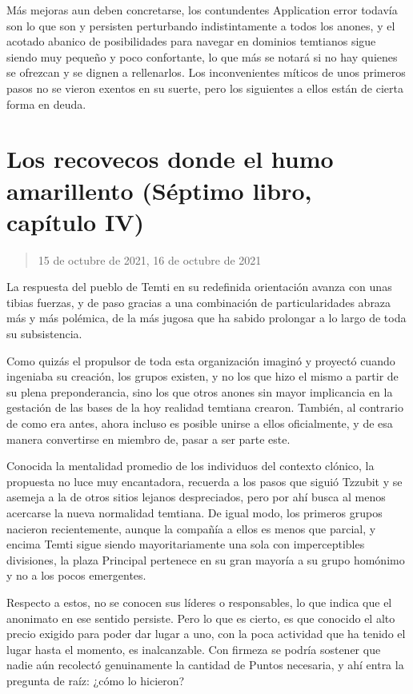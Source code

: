 \documentclass[
]{book}
\begin{document}
Más mejoras aun deben concretarse, los contundentes Application error todavía son lo que son y persisten perturbando indistintamente a todos los anones, y el acotado abanico de posibilidades para navegar en dominios temtianos sigue siendo muy pequeño y poco confortante, lo que más se notará si no hay quienes se ofrezcan y se dignen a rellenarlos. Los inconvenientes míticos de unos primeros pasos no se vieron exentos en su suerte, pero los siguientes a ellos están de cierta forma en deuda.

\hypertarget{los-recovecos-donde-el-humo-amarillento-suxe9ptimo-libro-capuxedtulo-iv}{%
\section{Los recovecos donde el humo amarillento (Séptimo libro, capítulo IV)}\label{los-recovecos-donde-el-humo-amarillento-suxe9ptimo-libro-capuxedtulo-iv}}

\begin{quote}
15 de octubre de 2021, 16 de octubre de 2021
\end{quote}

La respuesta del pueblo de Temti en su redefinida orientación avanza con unas tibias fuerzas, y de paso gracias a una combinación de particularidades abraza más y más polémica, de la más jugosa que ha sabido prolongar a lo largo de toda su subsistencia.

Como quizás el propulsor de toda esta organización imaginó y proyectó cuando ingeniaba su creación, los grupos existen, y no los que hizo el mismo a partir de su plena preponderancia, sino los que otros anones sin mayor implicancia en la gestación de las bases de la hoy realidad temtiana crearon. También, al contrario de como era antes, ahora incluso es posible unirse a ellos oficialmente, y de esa manera convertirse en miembro de, pasar a ser parte este.

Conocida la mentalidad promedio de los individuos del contexto clónico, la propuesta no luce muy encantadora, recuerda a los pasos que siguió Tzzubit y se asemeja a la de otros sitios lejanos despreciados, pero por ahí busca al menos acercarse la nueva normalidad temtiana. De igual modo, los primeros grupos nacieron recientemente, aunque la compañía a ellos es menos que parcial, y encima Temti sigue siendo mayoritariamente una sola con imperceptibles divisiones, la plaza Principal pertenece en su gran mayoría a su grupo homónimo y no a los pocos emergentes.

Respecto a estos, no se conocen sus líderes o responsables, lo que indica que el anonimato en ese sentido persiste. Pero lo que es cierto, es que conocido el alto precio exigido para poder dar lugar a uno, con la poca actividad que ha tenido el lugar hasta el momento, es inalcanzable. Con firmeza se podría sostener que nadie aún recolectó genuinamente la cantidad de Puntos necesaria, y ahí entra la pregunta de raíz: ¿cómo lo hicieron?
\end{document}
